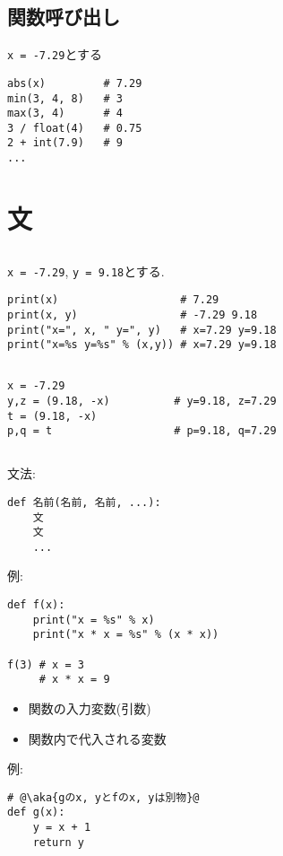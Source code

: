 \documentclass[landscape,7pt,dvipdfmx]{article}
\newcommand{\aka}[1]{{\color{red}{#1}}}
\newcommand{\ao}[1]{{\color{blue}{#1}}}
\begin{document}
\begin{multicols*}{3}
\subsection{関数呼び出し}
{\tt x = -7.29}とする
\begin{lstlisting}
abs(x)         # 7.29
min(3, 4, 8)   # 3
max(3, 4)      # 4
3 / float(4)   # 0.75
2 + int(7.9)   # 9
...
\end{lstlisting}



\section{文}
\subsection{\ao{print関数}}
{\tt x = -7.29}, {\tt y = 9.18}とする.
\begin{lstlisting}
print(x)                   # 7.29
print(x, y)                # -7.29 9.18
print("x=", x, " y=", y)   # x=7.29 y=9.18
print("x=%s y=%s" % (x,y)) # x=7.29 y=9.18
\end{lstlisting}

\subsection{\ao{代入文}}\label{subsec:assign}
\begin{lstlisting}
x = -7.29
y,z = (9.18, -x)          # y=9.18, z=7.29
t = (9.18, -x)
p,q = t                   # p=9.18, q=7.29
\end{lstlisting}

\subsection{\ao{関数定義}}
文法:
\begin{lstlisting}
def 名前(名前, 名前, ...):
    文
    文
    ...
\end{lstlisting}
例:
\begin{lstlisting}
def f(x):
    print("x = %s" % x)
    print("x * x = %s" % (x * x))

f(3) # x = 3
     # x * x = 9
\end{lstlisting}
\aka{以下は, 関数にローカルな変数と言い, 
関数呼び出しごとに別々に記憶される.}
\begin{itemize}
\item 関数の入力変数(引数)
\item 関数内で代入される変数
\end{itemize}
例:
\begin{lstlisting}
# @\aka{gのx, yとfのx, yは別物}@
def g(x):
    y = x + 1
    return y


\end{lstlisting}
\end{multicols*}
\end{document}
